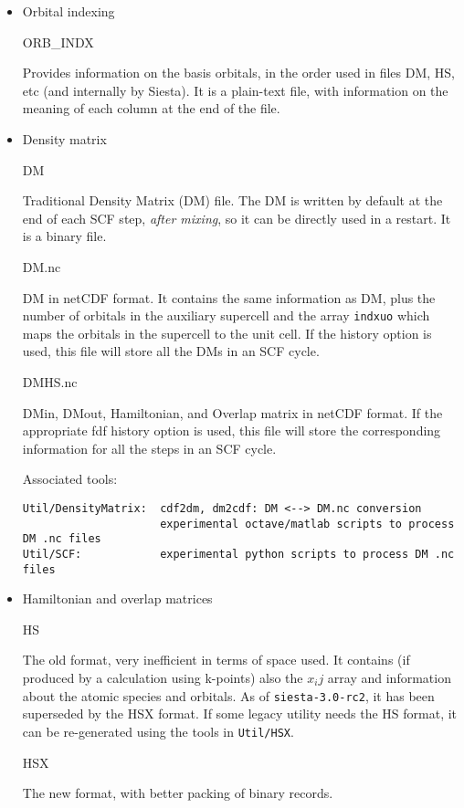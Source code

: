 \begin{itemize}
\item{Orbital indexing}

ORB\_INDX

Provides information on the basis orbitals, in the order used in files 
DM, HS, etc (and internally by Siesta). It is a plain-text file, with
information on the meaning of each column at the end of the file.

\item{Density matrix}

DM

Traditional Density Matrix (DM) file. The DM is written by default at
the end of each SCF step, {\em after mixing}, so it can be directly used
in a restart. It is a binary file.

DM.nc

DM in netCDF format. It contains the same information as DM, plus the
number of orbitals in the auxiliary supercell and the array \texttt{indxuo}
which maps the orbitals in the supercell to the unit cell.  If the history
option is used, this file will store all the DMs in an SCF cycle.

DMHS.nc

DMin, DMout, Hamiltonian, and Overlap matrix in netCDF format. If the
appropriate fdf history option is used, this file will store the
corresponding information for all the steps in an SCF cycle.

Associated tools:

\begin{verbatim}
Util/DensityMatrix:  cdf2dm, dm2cdf: DM <--> DM.nc conversion
                     experimental octave/matlab scripts to process DM .nc files
Util/SCF:            experimental python scripts to process DM .nc files
\end{verbatim}

\item{Hamiltonian and overlap matrices}

HS

The old format, very inefficient in terms of space used. It contains
(if produced by a calculation using k-points) also the $x_ij$ array
and information about the atomic species and orbitals. As of
\texttt{siesta-3.0-rc2}, it has been superseded by the HSX format. If some
legacy utility needs the HS format, it can be re-generated using
the tools in \texttt{Util/HSX}.

HSX

The new format, with better packing of binary records.


\end{itemize}
